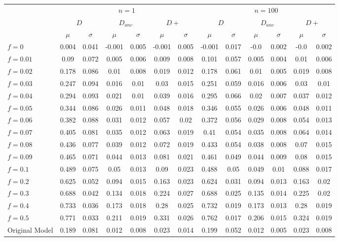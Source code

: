 \begin{tabular}{@{}lcccccccccccc@{}}
\toprule
 & \multicolumn{6}{c}{$n=1$} & \multicolumn{6}{c}{$n=100$} \\
\cmidrule(lr){2-7} \cmidrule(lr){8-13}
 & \multicolumn{2}{c}{$D$} & \multicolumn{2}{c}{$D_{anc}$} & \multicolumn{2}{c}{$D+$} & \multicolumn{2}{c}{$D$} & \multicolumn{2}{c}{$D_{anc}$} & \multicolumn{2}{c}{$D+$} \\
\cmidrule(lr){2-3} \cmidrule(lr){4-5} \cmidrule(lr){6-7} \cmidrule(lr){8-9} \cmidrule(lr){10-11} \cmidrule(lr){12-13}
 & $\mu$ & $\sigma$ & $\mu$ & $\sigma$ & $\mu$ & $\sigma$ & $\mu$ & $\sigma$ & $\mu$ & $\sigma$ & $\mu$ & $\sigma$ \\
\midrule
$f = 0$ & 0.004 & 0.041 & -0.001 & 0.005 & -0.001 & 0.005 & -0.001 & 0.017 & -0.0 & 0.002 & -0.0 & 0.002 \\
$f = 0.01$ & 0.09 & 0.072 & 0.005 & 0.006 & 0.009 & 0.008 & 0.101 & 0.057 & 0.005 & 0.004 & 0.01 & 0.006 \\
$f = 0.02$ & 0.178 & 0.086 & 0.01 & 0.008 & 0.019 & 0.012 & 0.178 & 0.061 & 0.01 & 0.005 & 0.019 & 0.008 \\
$f = 0.03$ & 0.247 & 0.094 & 0.016 & 0.01 & 0.03 & 0.015 & 0.251 & 0.059 & 0.016 & 0.006 & 0.03 & 0.01 \\
$f = 0.04$ & 0.294 & 0.093 & 0.021 & 0.01 & 0.039 & 0.016 & 0.295 & 0.066 & 0.02 & 0.007 & 0.037 & 0.012 \\
$f = 0.05$ & 0.344 & 0.086 & 0.026 & 0.011 & 0.048 & 0.018 & 0.346 & 0.055 & 0.026 & 0.006 & 0.048 & 0.011 \\
$f = 0.06$ & 0.382 & 0.088 & 0.031 & 0.012 & 0.057 & 0.02 & 0.372 & 0.056 & 0.029 & 0.008 & 0.054 & 0.013 \\
$f = 0.07$ & 0.405 & 0.081 & 0.035 & 0.012 & 0.063 & 0.019 & 0.41 & 0.054 & 0.035 & 0.008 & 0.064 & 0.014 \\
$f = 0.08$ & 0.436 & 0.077 & 0.039 & 0.012 & 0.072 & 0.019 & 0.433 & 0.054 & 0.038 & 0.008 & 0.07 & 0.015 \\
$f = 0.09$ & 0.465 & 0.071 & 0.044 & 0.013 & 0.081 & 0.021 & 0.461 & 0.049 & 0.044 & 0.009 & 0.08 & 0.015 \\
$f = 0.1$ & 0.489 & 0.075 & 0.05 & 0.013 & 0.09 & 0.023 & 0.488 & 0.05 & 0.049 & 0.01 & 0.088 & 0.017 \\
$f = 0.2$ & 0.625 & 0.052 & 0.094 & 0.015 & 0.163 & 0.023 & 0.624 & 0.031 & 0.094 & 0.013 & 0.163 & 0.02 \\
$f = 0.3$ & 0.688 & 0.042 & 0.134 & 0.018 & 0.224 & 0.027 & 0.688 & 0.025 & 0.135 & 0.014 & 0.225 & 0.02 \\
$f = 0.4$ & 0.733 & 0.036 & 0.173 & 0.018 & 0.28 & 0.025 & 0.732 & 0.019 & 0.173 & 0.013 & 0.28 & 0.019 \\
$f = 0.5$ & 0.771 & 0.033 & 0.211 & 0.019 & 0.331 & 0.026 & 0.762 & 0.017 & 0.206 & 0.015 & 0.324 & 0.019 \\
Original Model & 0.189 & 0.081 & 0.012 & 0.008 & 0.023 & 0.014 & 0.199 & 0.052 & 0.012 & 0.005 & 0.023 & 0.008 \\
\bottomrule
\end{tabular}
